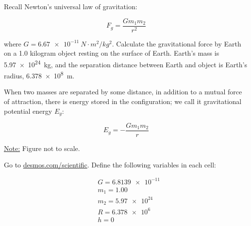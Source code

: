 \documentclass[]{exam}
\begin{document}
\begin{questions}
\question
Recall Newton's universal law of gravitation:

\begin{equation*}
    F_g = \frac{G m_1 m_2}{r^2}
\end{equation*}

where $G = \SI{6.67e-11}{N\cdot m^2/kg^2}$. Calculate the gravitational force by Earth on a 1.0 kilogram object resting on the surface of Earth. Earth's mass is \SI{5.97e24}{kg}, and the separation distance between Earth and object is Earth's radius, \SI{6.378e8}{m}.

\question
When two masses are separated by some distance, in addition to a mutual force of attraction, there is energy stored in the configuration; we call it gravitational potential energy $E_g$:

\bigskip

\begin{minipage}{0.4\textwidth}
\Large 
\begin{equation*}
    E_g = -\frac{G m_1 m_2}{r}
\end{equation*}
\end{minipage}%
\begin{minipage}{0.4\textwidth}
\centering
{}

\underline{Note:} Figure not to scale.
\end{minipage}

\bigskip


Go to \href{https://www.desmos.com/scientific}{desmos.com/scientific}. Define the following variables in each cell:
\vspace{-1em}

\begin{align*}
    & G = \num{6.8139e-11} \\[1ex]
    & m_1 = 1.00 \\[1ex]
    & m_2 = \num{5.97e24} \\[1ex]
    & R = \num{6.378e6} \\[1ex]
    & h = 0 
\end{align*}


\end{questions}
\end{document}
